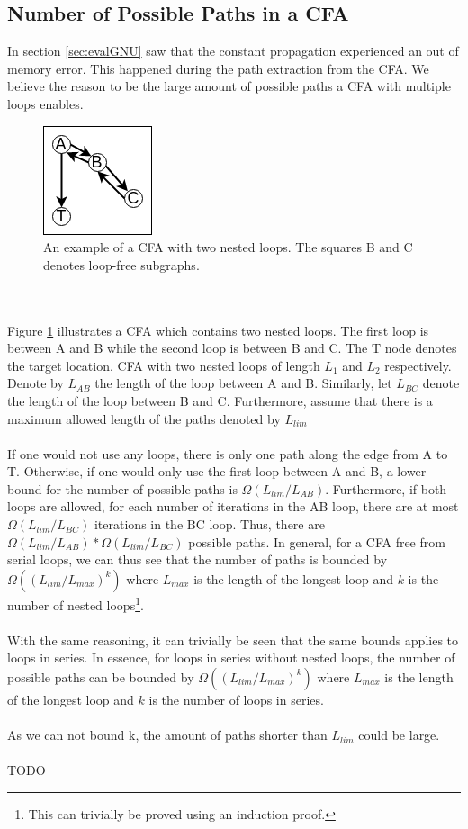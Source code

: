 \documentclass{kththesis}
\begin{document}
\subsection{Number of Possible Paths in a CFA}\label{sec:numPaths}
In section \ref{sec:evalGNU} saw that the constant propagation experienced an out of memory error. This happened during the path extraction from the CFA. We believe the reason to be the large amount of possible paths a CFA with multiple loops enables.
\begin{figure}[th]
    \centering
    \includegraphics[scale=1]{Images/nestedCFA.png}
    \caption{An example of a CFA with two nested loops. The squares B and C denotes loop-free subgraphs.}
    \label{fig:pathExpNested}
\end{figure}
\\ \\
Figure \ref{fig:pathExpNested} illustrates a CFA which contains two nested loops. The first loop is between A and B while the second loop is between B and C. The T node denotes the target location.  CFA with two nested loops of length $L_1$ and $L_2$ respectively. Denote by $L_{AB}$ the length of the loop between A and B. Similarly, let $L_{BC}$ denote the length of the loop between B and C. Furthermore, assume that there is a maximum allowed length of the paths denoted by $L_{lim}$ 
\\ \\ 
If one would not use any loops, there is only one path along the edge from A to T. Otherwise, if one would only use the first loop between A and B, a lower bound for the number of possible paths is $\Omega(L_{lim}/L_{AB})$. Furthermore, if both loops are allowed, for each number of iterations in the AB loop, there are at most $\Omega(L_{lim}/L_{BC})$ iterations in the BC loop. Thus, there are $\Omega(L_{lim}/L_{AB})*\Omega(L_{lim}/L_{BC})$ possible paths. In general, for a CFA free from serial loops, we can thus see that the number of paths is bounded by $\Omega((L_{lim}/L_{max})^k)$ where $L_{max}$ is the length of the longest loop and $k$ is the number of nested loops\footnote{This can trivially be proved using an induction proof.}. 
\\ \\
With the same reasoning, it can trivially be seen that the same bounds applies to loops in series. In essence, for loops in series without nested loops, the number of possible paths can be bounded by $\Omega((L_{lim}/L_{max})^k)$ where $L_{max}$ is the length of the longest loop and $k$ is the number of loops in series.
\\ \\
As we can not bound k, the amount of paths shorter than $L_{lim}$ could be large.
\\ \\
TODO
\end{document}
